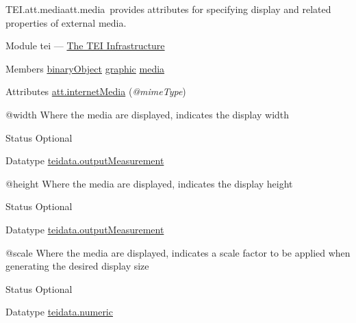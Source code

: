 \begin{reflist}
\item[]\begin{specHead}{TEI.att.media}{att.media} provides attributes for specifying display and related properties of external media.\end{specHead} 
    \item[{Module}]
  tei — \hyperref[ST]{The TEI Infrastructure}
    \item[{Members}]
  \hyperref[TEI.binaryObject]{binaryObject} \hyperref[TEI.graphic]{graphic} \hyperref[TEI.media]{media}
    \item[{Attributes}]
  \hyperref[TEI.att.internetMedia]{att.internetMedia} (\textit{@mimeType}) \hfil\\[-10pt]\begin{sansreflist}
    \item[@width]
  Where the media are displayed, indicates the display width
\begin{reflist}
    \item[{Status}]
  Optional
    \item[{Datatype}]
  \hyperref[TEI.teidata.outputMeasurement]{teidata.outputMeasurement}
\end{reflist}  
    \item[@height]
  Where the media are displayed, indicates the display height
\begin{reflist}
    \item[{Status}]
  Optional
    \item[{Datatype}]
  \hyperref[TEI.teidata.outputMeasurement]{teidata.outputMeasurement}
\end{reflist}  
    \item[@scale]
  Where the media are displayed, indicates a scale factor to be applied when generating the desired display size
\begin{reflist}
    \item[{Status}]
  Optional
    \item[{Datatype}]
  \hyperref[TEI.teidata.numeric]{teidata.numeric}
\end{reflist}  
\end{sansreflist}  
\end{reflist}  
